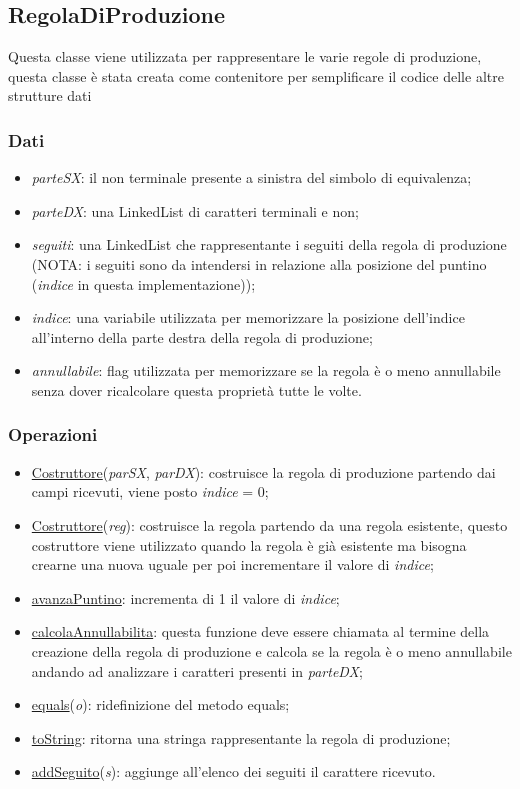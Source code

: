 \documentclass[12pt]{article}
\begin{document}
\subsection{RegolaDiProduzione}
Questa classe viene utilizzata per rappresentare le varie regole di produzione, questa classe è stata creata come contenitore per semplificare il codice delle altre strutture dati
\subsubsection{Dati}
\begin{itemize}
\item\textit{parteSX}: il non terminale presente a sinistra del simbolo di equivalenza;
\item\textit{parteDX}: una LinkedList di caratteri terminali e non;
\item\textit{seguiti}: una LinkedList che rappresentante i seguiti della regola di produzione (NOTA: i seguiti sono da intendersi in relazione alla posizione del puntino (\textit{indice} in questa implementazione));
\item\textit{indice}: una variabile utilizzata per memorizzare la posizione dell'indice all'interno della parte destra della regola di produzione;
\item\textit{annullabile}: flag utilizzata per memorizzare se la regola è o meno annullabile senza dover ricalcolare questa proprietà tutte le volte.
\end{itemize}
\subsubsection{Operazioni}
\begin{itemize}
\item\underline{Costruttore}(\textit{parSX}, \textit{parDX}): costruisce la regola di produzione partendo dai campi ricevuti, viene posto \textit{indice} = 0;
\item\underline{Costruttore}(\textit{reg}): costruisce la regola partendo da una regola esistente, questo costruttore viene utilizzato quando la regola è già esistente ma bisogna crearne una nuova uguale per poi incrementare il valore di \textit{indice};
\item\underline{avanzaPuntino}: incrementa di 1 il valore di \textit{indice};
\item\underline{calcolaAnnullabilita}: questa funzione deve essere chiamata al termine della creazione della regola di produzione e calcola se la regola è o meno annullabile andando ad analizzare i caratteri presenti in \textit{parteDX};
\item\underline{equals}(\textit{o}): ridefinizione del metodo equals;
\item\underline{toString}: ritorna una stringa rappresentante la regola di produzione;
\item\underline{addSeguito}(\textit{s}): aggiunge all'elenco dei seguiti il carattere ricevuto.
\end{itemize}
\end{document}
